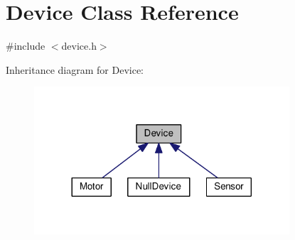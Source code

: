 \hypertarget{class_device}{}\section{Device Class Reference}
\label{class_device}


{\ttfamily \#include $<$device.\+h$>$}



Inheritance diagram for Device\+:\nopagebreak
\begin{figure}[H]
\begin{center}
\leavevmode
\includegraphics[width=269pt]{class_device__inherit__graph}
\end{center}
\end{figure}
